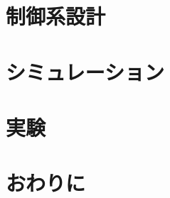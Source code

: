 \documentclass[a4j,11pt,twoside]{jbook}
\begin{document}

\chapter{制御系設計}




\chapter{シミュレーション}



\chapter{実験}



\chapter{おわりに}





\end{document}
